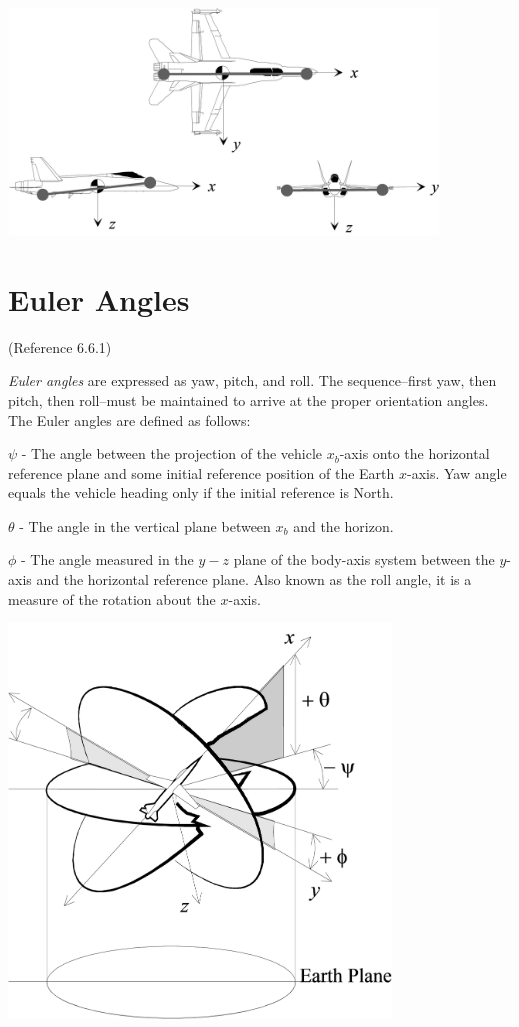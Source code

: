\documentclass[
]{book}
\providecommand{\tightlist}{%
  \setlength{\itemsep}{0pt}\setlength{\parskip}{0pt}}
\begin{document}
\includegraphics[width=4.5in,height=2.375in]{media/06/image11.svg}

\hypertarget{euler-angles}{%
\section{Euler Angles}\label{euler-angles}}

(Reference 6.6.1)

\emph{Euler angles} are expressed as yaw, pitch, and roll. The sequence--first yaw, then pitch, then roll--must be maintained to arrive at the proper orientation angles. The Euler angles are defined as follows:

\begin{description}
\tightlist
\item[Yaw Angle]
\(\psi\) - The angle between the projection of the vehicle \(x_b\)-axis onto the horizontal reference plane and some initial reference position of the Earth \(x\)-axis. Yaw angle equals the vehicle heading only if the initial reference is North.
\item[Pitch Angle]
\(\theta\) - The angle in the vertical plane between \(x_b\) and the horizon.
\item[Bank Angle]
\(\phi\) - The angle measured in the \(y-z\) plane of the body-axis system between the \(y\)-axis and the horizontal reference plane. Also known as the roll angle, it is a measure of the rotation about the \(x\)-axis.
\end{description}

\includegraphics[width=4in,height=4.125in]{media/06/image12.svg}
\end{document}
